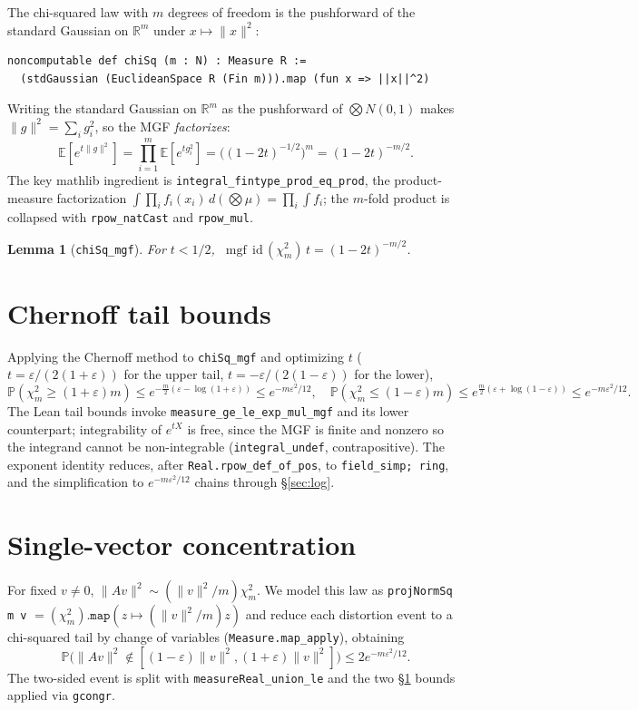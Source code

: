 \documentclass[11pt]{article}
\newtheorem{lemma}{Lemma}
\theoremstyle{remark}
\newcommand{\R}{\mathbb{R}}
\newcommand{\E}{\mathbb{E}}
\newcommand{\Prob}{\mathbb{P}}
\newcommand{\eps}{\varepsilon}
\newcommand{\norm}[1]{\lVert #1 \rVert}
\DeclareMathOperator{\mgf}{mgf}
\begin{document}
The chi-squared law with $m$ degrees of freedom is the pushforward of the standard
Gaussian on $\R^m$ under $x\mapsto\norm x^2$:
\begin{lstlisting}
noncomputable def chiSq (m : N) : Measure R :=
  (stdGaussian (EuclideanSpace R (Fin m))).map (fun x => ||x||^2)
\end{lstlisting}
Writing the standard Gaussian on $\R^m$ as the pushforward of $\bigotimes N(0,1)$ makes
$\norm g^2=\sum_i g_i^2$, so the MGF \emph{factorizes}:
\[
  \E[e^{t\norm g^2}] = \prod_{i=1}^m \E[e^{tg_i^2}] = \big((1-2t)^{-1/2}\big)^m
  = (1-2t)^{-m/2}.
\]
The key mathlib ingredient is \texttt{integral\_fintype\_prod\_eq\_prod}, the
product-measure factorization $\int\prod_i f_i(x_i)\,d(\bigotimes\mu)=\prod_i\int f_i$;
the $m$-fold product is collapsed with \texttt{rpow\_natCast} and \texttt{rpow\_mul}.

\begin{lemma}[\texttt{chiSq\_mgf}]
For $t<1/2$, $\ \mgf\,\mathrm{id}\,(\chi^2_m)\,t = (1-2t)^{-m/2}$.
\end{lemma}

\section{Chernoff tail bounds}\label{sec:tails}

Applying the Chernoff method to \texttt{chiSq\_mgf} and optimizing $t$
($t=\eps/(2(1+\eps))$ for the upper tail, $t=-\eps/(2(1-\eps))$ for the lower),
\[
  \Prob(\chi^2_m\ge(1+\eps)m)\le e^{-\frac m2(\eps-\log(1+\eps))}\le e^{-m\eps^2/12},
  \quad
  \Prob(\chi^2_m\le(1-\eps)m)\le e^{\frac m2(\eps+\log(1-\eps))}\le e^{-m\eps^2/12}.
\]
The Lean tail bounds invoke \texttt{measure\_ge\_le\_exp\_mul\_mgf} and its lower
counterpart; integrability of $e^{tX}$ is free, since the MGF is finite and nonzero so the
integrand cannot be non-integrable (\texttt{integral\_undef}, contrapositive). The
exponent identity reduces, after \texttt{Real.rpow\_def\_of\_pos}, to
\texttt{field\_simp; ring}, and the simplification to $e^{-m\eps^2/12}$ chains through
\S\ref{sec:log}.

\section{Single-vector concentration}\label{sec:proj}

For fixed $v\ne0$, $\norm{Av}^2\sim(\norm v^2/m)\chi^2_m$. We model this law as
\texttt{projNormSq m v} $=(\chi^2_m).\mathtt{map}(z\mapsto(\norm v^2/m)z)$ and reduce each
distortion event to a chi-squared tail by change of variables
(\texttt{Measure.map\_apply}), obtaining
\[
  \Prob\big(\norm{Av}^2\notin[(1-\eps)\norm v^2,(1+\eps)\norm v^2]\big)\le 2e^{-m\eps^2/12}.
\]
The two-sided event is split with \texttt{measureReal\_union\_le} and the two
\S\ref{sec:tails} bounds applied via \texttt{gcongr}.
\end{document}
